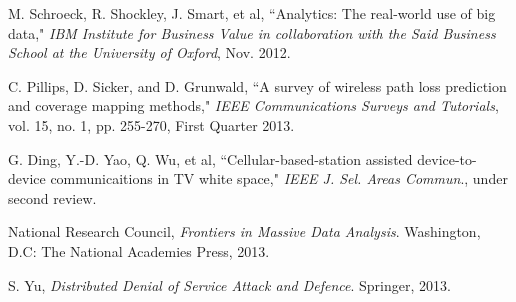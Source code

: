 \documentclass[12pt,draftcls,journal,letterpaper,oneside,onecolumn]{IEEEtran}
\begin{document}
\begin{thebibliography}{99}
M. Schroeck, R. Shockley, J. Smart, et al, ``Analytics: The real-world use of big data," \emph{IBM Institute for Business Value in collaboration with the Said Business School at the University of Oxford}, Nov. 2012. 


C. Pillips, D. Sicker, and D. Grunwald, ``A survey of wireless path loss prediction and coverage mapping methods," \emph{IEEE Communications Surveys and Tutorials}, vol. 15, no. 1, pp. 255-270, First Quarter 2013.


G. Ding, Y.-D. Yao, Q. Wu, et al, ``Cellular-based-station assisted device-to-device communicaitions in TV white space," \emph{IEEE J. Sel. Areas Commun}., under second review.

National Research Council, \emph{Frontiers in Massive Data Analysis}. Washington, D.C: The National Academies Press, 2013.

S. Yu, \emph{Distributed Denial of Service Attack and Defence}. Springer, 2013.













\end{thebibliography}
\end{document}
